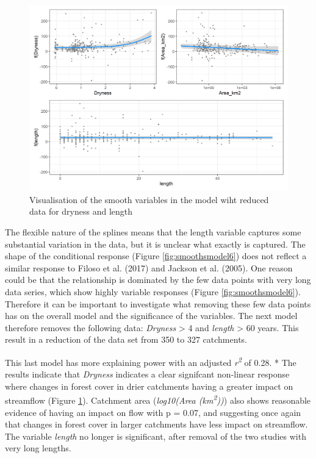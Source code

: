 \documentclass[]{elsarticle} %
\begin{document}
\begin{figure}
\includegraphics[width=0.9\linewidth]{model7_smooths} \caption{Visualisation of the smooth variables in the model wiht reduced data for dryness and length}\label{fig:smoothsmodel7}
\end{figure}

The flexible nature of the splines means that the length variable captures some substantial variation in the data, but it is unclear what exactly is captured. The shape of the conditional response (Figure \ref{fig:smoothsmodel6}) does not reflect a similar response to Filoso et al. (2017) and Jackson et al. (2005). One reason could be that the relationship is dominated by the few data points with very long data series, which show highly variable responses (Figure \ref{fig:smoothsmodel6}). Therefore it can be important to investigate what removing these few data points has on the overall model and the significance of the variables. The next model therefore removes the following data: \emph{Dryness} \textgreater{} 4 and \emph{length} \textgreater{} 60 years. This result in a reduction of the data set from 350 to 327 catchments.

This last model has more explaining power with an adjusted \emph{r\textsuperscript{2}} of 0.28. * The results indicate that \emph{Dryness} indicates a clear signifcant non-linear response where changes in forest cover in drier catchments having a greater impact on streamflow (Figure \ref{fig:smoothsmodel7}). Catchment area (\emph{log10(Area (km\textsuperscript{2}))}) also shows reasonable evidence of having an impact on flow with p = 0.07, and suggesting once again that changes in forest cover in larger catchments have less impact on streamflow. The variable \emph{length} no longer is significant, after removal of the two studies with very long lengths.
\end{document}
